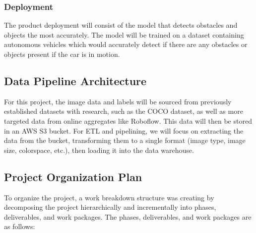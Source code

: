 \documentclass[stu,12pt,floatsintext]{apa7}
\begin{document}
\subsubsection{Deployment}
The product deployment will consist of the model that detects obstacles and objects the most accurately. The model will be trained on a dataset containing autonomous vehicles which would accurately detect if there are any obstacles or objects present if the car is in motion.


\subsection{Data Pipeline Architecture}

For this project, the image data and labels will be sourced from previously established datasets with research, such as the COCO dataset, as well as more targeted data from online aggregates like Roboflow. This data will then be stored in an AWS S3 bucket. For ETL and pipelining, we will focus on extracting the data from the bucket, transforming them to a single format (image type, image size, colorspace, etc.), then loading it into the data warehouse.

\subsection{Project Organization Plan}
To organize the project, a work breakdown structure was creating by decomposing the project hierarchically and incrementally into phases, deliverables, and work packages. The phases, deliverables, and work packages are as follows:
\end{document}
